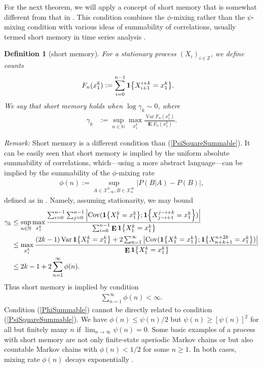 \documentclass[a4paper,12pt]{article}
\newcommand{\abs}[1]{\left| #1 \right|}
\newcommand{\kwad}[1]{\left[ #1 \right]}
\newcommand{\klam}[1]{\left\{ #1 \right\}}
\DeclareMathOperator{\cov}{Cov}
\DeclareMathOperator{\var}{Var}
\DeclareMathOperator{\mean}{\mathbf{E}}
\newcommand{\boole}[1]{{\bf 1}{\klam{#1}}}
\newtheorem{definition}{Definition}
\begin{document}
For the next theorem, we will apply a concept of short memory that is
somewhat different from that in \cite{Szpankowski93}.  This condition
combines the $\phi$-mixing rather than the $\psi$-mixing condition
\cite{Bradley05} with various ideas of summability of correlations,
usually termed short memory in time series analysis \cite{Beran94}.
\begin{definition}[short memory] For a stationary process
  $(X_i)_{i\in\mathbb{Z}}$, we define counts
\begin{align}
  F_n(x_1^k)&:=\sum_{i=0}^{n-1}\boole{X_{i+1}^{i+k}=x_1^k}.
\end{align}
We say that short memory holds when $\log \gamma_k\sim 0$,
where
\begin{align}
  \label{GammaDelta}
  \gamma_k&:=\sup_{n\in\mathbb{N}}\max_{x_1^k}
            \frac{\var F_n(x_1^k)}{\mean F_n(x_1^k)}
            .
\end{align}
\end{definition}
\noindent
\emph{Remark:} Short memory is a different condition than
(\ref{PsiSquareSummable}). It can be easily seen that short memory is
implied by the uniform absolute summability of correlations,
which---using a more abstract language---can be implied by the
summability of the $\phi$-mixing rate
\begin{align}
  \phi(n):=
  \sup_{A\in\mathcal{X}_{-\infty}^0,B\in\mathcal{X}_n^{\infty}}\abs{P(B|A)-P(B)},
\end{align}
defined as in \cite{Bradley05}. Namely, assuming stationarity, we may
bound
\begin{align}
  \gamma_k
  &\le
    \sup_{n\in\mathbb{N}}\max_{x_1^k}
    \frac{\sum_{i=0}^{n-1}\sum_{j=0}^{n-1}
    \abs{\cov(\boole{X_{1}^{k}=x_1^k};\boole{X_{j-i+1}^{j-i+k}=x_1^k})}}{
    \sum_{i=0}^{n-1}\mean\boole{X_{1}^{k}=x_1^k}}
    \nonumber\\
  &\le
    \max_{x_1^k}
    \frac{(2k-1)\var\boole{X_{1}^{k}=x_1^k}
    +
    2\sum_{n=1}^\infty
    \abs{\cov(\boole{X_{1}^{k}=x_1^k};\boole{X_{n+k+1}^{n+2k}=x_1^k})}}{
    \mean\boole{X_{1}^{k}=x_1^k}}
    \nonumber\\
  &\le
    2k-1+2\sum_{n=1}^\infty \phi(n)
    .
  \label{Summable}
\end{align}
Thus short memory is implied by condition
\begin{align}
  \label{PhiSummable}
  \sum_{n=1}^\infty \phi(n)<\infty.
\end{align}
Condition (\ref{PhiSummable}) cannot be directly related to condition
(\ref{PsiSquareSummable}). We have $\phi(n)\le \psi(n)/2$
\cite[Eq. (1.11)]{Bradley05} but $\psi(n)\ge \kwad{\psi(n)}^2$ for all
but finitely many $n$ if $\lim_{n\to\infty} \psi(n)=0$.  Some basic
examples of a process with short memory %
are not only finite-state aperiodic Markov chains or but also
countable Markov chains with $\phi(n)<1/2$ for some $n\ge 1$. In both
cases, mixing rate $\phi(n)$ decays exponentially \cite[Theorems 3.1
and 3.3]{Bradley05}.
\end{document}
